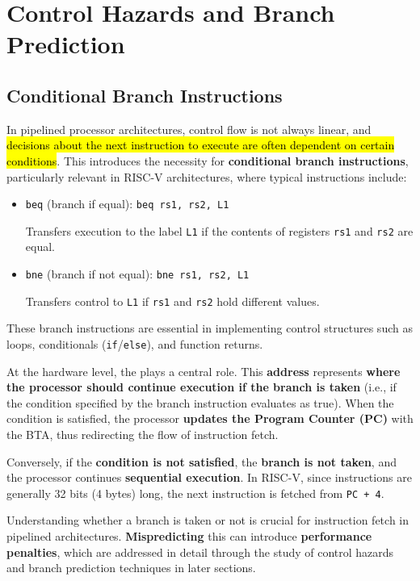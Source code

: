 \section{Control Hazards and Branch Prediction}

\subsection{Conditional Branch Instructions}

In pipelined processor architectures, control flow is not always linear, and \hl{decisions about the next instruction to execute are often dependent on certain conditions}. This introduces the necessity for \textbf{conditional branch instructions}, particularly relevant in RISC-V architectures, where typical instructions include:
\begin{itemize}
    \item \texttt{beq} (branch if equal): \texttt{beq rs1, rs2, L1}

    Transfers execution to the label \texttt{L1} if the contents of registers \texttt{rs1} and \texttt{rs2} are equal.

    \item \texttt{bne} (branch if not equal): \texttt{bne rs1, rs2, L1}
    
    Transfers control to \texttt{L1} if \texttt{rs1} and \texttt{rs2} hold different values.
\end{itemize}
These branch instructions are essential in implementing control structures such as loops, conditionals (\texttt{if}/\texttt{else}), and function returns.

\highspace
At the hardware level, the  plays a central role. This \textbf{address} represents \textbf{where the processor should continue execution if the branch is taken} (i.e., if the condition specified by the branch instruction evaluates as true). When the condition is satisfied, the processor \textbf{updates the Program Counter (PC)} with the BTA, thus redirecting the flow of instruction fetch.

\highspace
Conversely, if the \textbf{condition is not satisfied}, the \textbf{branch is not taken}, and the processor continues \textbf{sequential execution}. In RISC-V, since instructions are generally 32 bits (4 bytes) long, the next instruction is fetched from \texttt{PC + 4}.

\highspace
Understanding whether a branch is taken or not is crucial for instruction fetch in pipelined architectures. \textbf{Mispredicting} this can introduce \textbf{performance penalties}, which are addressed in detail through the study of control hazards and branch prediction techniques in later sections.

